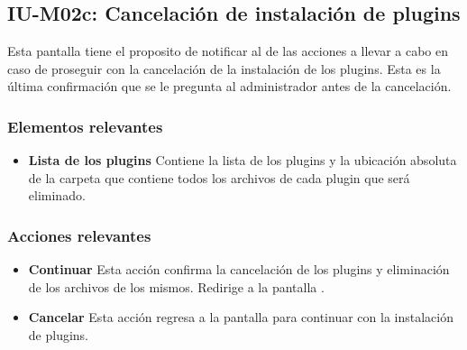 
\subsection{IU-M02c: Cancelación de instalación de plugins}

 Esta pantalla tiene el proposito de notificar al  de las acciones a
 llevar a cabo en caso de proseguir con la cancelación de la instalación de los plugins. Esta es
 la última confirmación que se le pregunta al administrador antes de la cancelación.


\subsubsection{Elementos relevantes}

    \begin{itemize}
    \item {\bf Lista de los plugins}
        Contiene la lista de los plugins y la ubicación absoluta de la carpeta
        que contiene todos los archivos de cada plugin que será eliminado.
    \end{itemize}

\subsubsection{Acciones relevantes}

    \begin{itemize}
    \item {\bf Continuar}
        Esta acción confirma la cancelación de los plugins y eliminación de los
        archivos de los mismos. Redirige a la pantalla .

    \item {\bf Cancelar}
        Esta acción regresa a la pantalla  para continuar con la instalación
        de plugins.
    \end{itemize}

\clearpage
